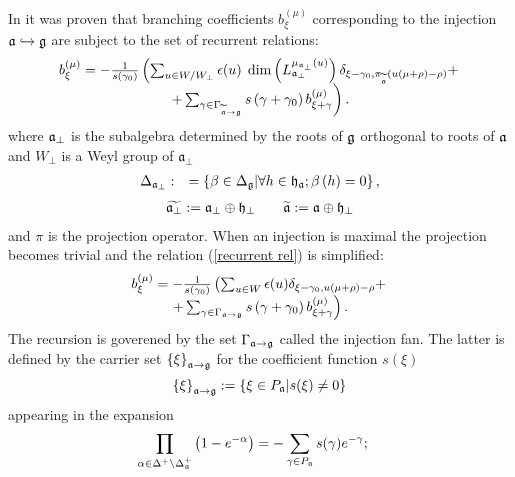 In \cite{2010arXiv1007.0318L} it was proven that branching coefficients $%
b_{\xi }^{\left( \mu \right) }$ corresponding to the injection $\frak{a}%
\hookrightarrow \frak{g}$ are subject to the set of recurrent relations:
\begin{equation}
\begin{array}{c}
b_{\xi }^{\left( \mu \right) }=-\frac{1}{s\left( \gamma _{0}\right) }\left(
\sum_{u\in W/W_{\perp}}\epsilon (u)\;\dim \left( L_{\frak{a}_{\perp }}^{\mu _{\frak{a}%
_{\perp }}\left( u\right) }\right) \delta _{\xi -\gamma _{0},\pi _{%
\widetilde{\frak{a}}}(u(\mu +\rho )-\rho )}+\right. \\
\left. +\sum_{\gamma \in \Gamma _{\widetilde{\frak{a}}\rightarrow \frak{g}%
}}s\left( \gamma +\gamma _{0}\right) b_{\xi +\gamma }^{\left( \mu \right)
}\right) .
\end{array}
\label{recurrent rel}
\end{equation}
where $\frak{a}_{\perp }$ is the subalgebra determined by the roots of $%
\frak{g}$ orthogonal to roots of $\frak{a}$ and $W_{\perp}$ is a Weyl group of $\mathfrak{a}_{\perp}$
\begin{eqnarray}
\Delta _{\frak{a}_{\perp }} &:&=\left\{ \beta \in \Delta _{\frak{g}}|\forall
h\in \frak{h}_{\frak{a}};\beta \left( h\right) =0\right\} ,
\label{delta a ort}
\end{eqnarray}
\begin{eqnarray}
\widetilde{\frak{a}_{\perp }} :=\frak{a}_{\perp }\oplus \frak{h}_{\perp }
\qquad \widetilde{\frak{a}} :=\frak{a}\oplus \frak{h}_{\perp }
\end{eqnarray}
and $\pi$ is the projection operator. When an injection is maximal the
projection becomes trivial and the relation (\ref{recurrent rel}) is
simplified:
\begin{equation}
\begin{array}{c}
b_{\xi }^{\left( \mu \right) }=-\frac{1}{s\left( \gamma _{0}\right) }\left(
\sum_{u\in W}\epsilon (u) \delta _{\xi -\gamma _{0}, u(\mu +\rho )-\rho
}+\right. \\
\left. +\sum_{\gamma \in \Gamma _{\frak{a}\rightarrow \frak{g}}}s\left(
\gamma +\gamma _{0}\right) b_{\xi +\gamma }^{\left( \mu \right) }\right) .
\end{array}
\label{recurrent relation max}
\end{equation}
The recursion is goverened by the set $\Gamma _{\frak{a}\rightarrow \frak{g}}
$ called the injection fan. The latter is defined by the carrier set $%
\left\{ \xi \right\} _{\frak{a}\rightarrow \frak{g}}$ for the coefficient
function $s(\xi )$
\[
\left\{ \xi \right\} _{\frak{a}\rightarrow \frak{g}}:=\left\{ \xi \in P_{%
\frak{a}}|s(\xi )\neq 0\right\}
\]
appearing in the expansion
\begin{equation}
\prod_{\alpha \in \Delta ^{+}\setminus \Delta _{\frak{a}}^{+}}\left( 1-e^{
-\alpha }\right) =-\sum_{\gamma \in P_{\frak{a}}}s(\gamma )e^{-\gamma };\quad
\label{product}
\end{equation}

